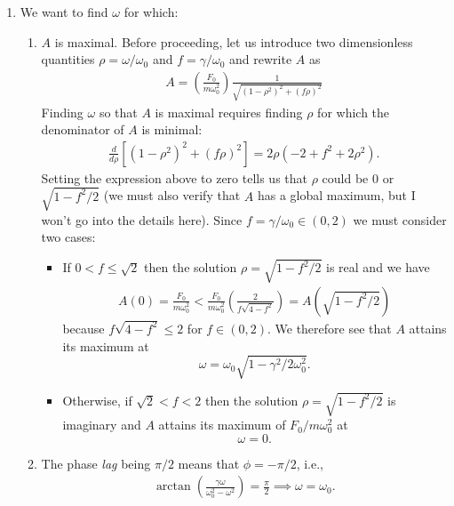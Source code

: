 \documentclass{article}
\theoremstyle{definition}
\newcommand{\f}[2]{\frac{#1}{#2}}
\newcommand{\lp}{\left(}
\newcommand{\rp}{\right)}
\newcommand{\lb}{\left[}
\newcommand{\rb}{\right]}
\begin{document}
\begin{enumerate}[label= \alph*)]
	\item We want to find $\omega$ for which:
	
	\begin{enumerate}[label=\roman*)]
		\item $A$ is maximal. Before proceeding, let us introduce two dimensionless quantities $\rho = \omega/\omega_0$ and $f = \gamma/\omega_0$ and rewrite $A$ as 
		\begin{align*}
		A =  \lp \f{F_0}{m \omega_0^2}\rp \f{1}{\sqrt{(1-\rho^2)^2 + (f\rho)^2}}
		\end{align*}
		Finding $\omega$ so that $A$ is maximal requires finding $\rho$ for which the denominator of $A$ is minimal:
		\begin{align*}
		\f{d}{d\rho}\lb (1-\rho^2)^2 + (f\rho)^2 \rb = 2\rho(-2 + f^2 + 2\rho^2).
		\end{align*}
		Setting the expression above to zero tells us that $\rho$ could be $0$ or $\sqrt{1-f^2/2}$ (we must also verify that $A$ has a global maximum, but I won't go into the details here). Since $f = \gamma/\omega_0 \in (0,2)$ we must consider two cases:
		\begin{itemize}
			\item If ${0 < f \leq \sqrt{2}}$ then the solution $\rho = \sqrt{1-f^2/2}$ is real and we have 
			\begin{align*}
			A(0)= \f{F_0}{m\omega_0^2} <  \f{F_0}{m\omega_0^2} \lp \f{2}{f\sqrt{4-f^2}}\rp  = A\lp \sqrt{1-f^2/2}\rp
			\end{align*}
			because $f\sqrt{4-f^2} \leq 2$ for $f\in (0,2)$. We therefore see that $A$ attains its maximum at $$\omega = \omega_0 \sqrt{1- \gamma^2/2\omega_0^2}.$$
			
			
			
			\item Otherwise, if ${\sqrt{2} < f < 2}$ then the solution $\rho = \sqrt{1-f^2/2}$ is imaginary and $A$ attains its maximum of $F_0/m\omega_0^2$ at $$\omega = 0.$$
		\end{itemize}
	
	
	
	\item The phase \textit{lag} being $\pi/2$ means that $\phi = -\pi/2$, i.e.,
	\begin{align*}
	\arctan\lp \f{\gamma \omega}{\omega_0^2 - \omega^2} \rp = \f{\pi}{2} \implies \omega = \omega_0.
	\end{align*}
	

\end{enumerate}
\end{enumerate}
\end{document}
